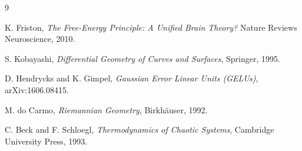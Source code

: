 \documentclass[11pt]{article}
\begin{document}
\begin{thebibliography}{9}

K. Friston,
\textit{The Free-Energy Principle: A Unified Brain Theory?}
Nature Reviews Neuroscience, 2010.

S. Kobayashi,
\textit{Differential Geometry of Curves and Surfaces},
Springer, 1995.

D. Hendrycks and K. Gimpel,
\textit{Gaussian Error Linear Units (GELUs)},
arXiv:1606.08415.

M. do Carmo,
\textit{Riemannian Geometry},
Birkhäuser, 1992.

C. Beck and F. Schloegl,
\textit{Thermodynamics of Chaotic Systems},
Cambridge University Press, 1993.

\end{thebibliography}
\end{document}
